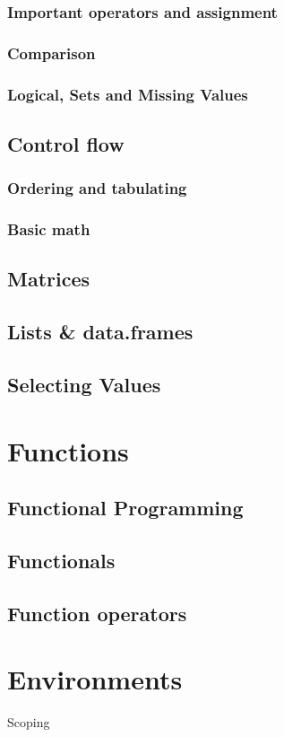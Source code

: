 \documentclass[]{book}
\theoremstyle{definition}
\theoremstyle{definition}
\theoremstyle{definition}
\theoremstyle{remark}
\begin{document}
\subsubsection{Important operators and
assignment}\label{important-operators-and-assignment}

\subsubsection{Comparison}\label{comparison}

\subsubsection{Logical, Sets and Missing
Values}\label{logical-sets-and-missing-values}

\subsection{Control flow}\label{control-flow}

\subsubsection{Ordering and tabulating}\label{ordering-and-tabulating}

\subsubsection{Basic math}\label{basic-math}

\subsection{Matrices}\label{matrices}

\subsection{Lists \& data.frames}\label{lists-data.frames}

\subsection{Selecting Values}\label{selecting-values}

\section{Functions}\label{functions}

\subsection{Functional Programming}\label{functional-programming}

\subsection{Functionals}\label{functionals}

\subsection{Function operators}\label{function-operators}

\section{Environments}\label{environments}

Scoping


\end{document}
